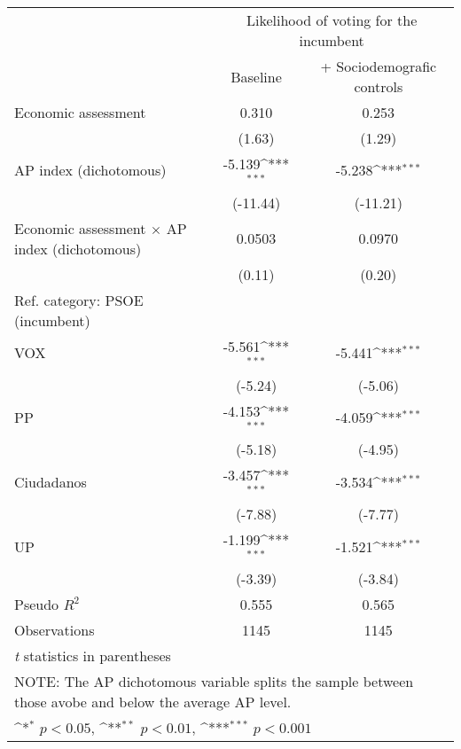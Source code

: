 {
\def\sym#1{\ifmmode^{#1}\else\(^{#1}\)\fi}
\begin{tabular}{l*{2}{c}}
\toprule
                &\multicolumn{2}{c}{Likelihood of voting for the incumbent}\\\cmidrule(lr){2-3}
                & Baseline         &+ Sociodemografic controls         \\
\midrule
Economic assessment&    0.310         &    0.253         \\
                &   (1.63)         &   (1.29)         \\
AP index (dichotomous)&   -5.139\sym{***}&   -5.238\sym{***}\\
                & (-11.44)         & (-11.21)         \\
Economic assessment $\times$ AP index (dichotomous)&   0.0503         &   0.0970         \\
                &   (0.11)         &   (0.20)         \\
Ref. category: PSOE (incumbent)&                  &                  \\
VOX             &   -5.561\sym{***}&   -5.441\sym{***}\\
                &  (-5.24)         &  (-5.06)         \\
PP              &   -4.153\sym{***}&   -4.059\sym{***}\\
                &  (-5.18)         &  (-4.95)         \\
Ciudadanos      &   -3.457\sym{***}&   -3.534\sym{***}\\
                &  (-7.88)         &  (-7.77)         \\
UP              &   -1.199\sym{***}&   -1.521\sym{***}\\
                &  (-3.39)         &  (-3.84)         \\
\midrule
Pseudo \(R^{2}\)&    0.555         &    0.565         \\
Observations    &     1145         &     1145         \\
\bottomrule
\multicolumn{3}{l}{\footnotesize \textit{t} statistics in parentheses}\\
\multicolumn{3}{l}{\footnotesize NOTE: The AP dichotomous variable splits the sample between those avobe and below the average AP level.}\\
\multicolumn{3}{l}{\footnotesize \sym{*} \(p<0.05\), \sym{**} \(p<0.01\), \sym{***} \(p<0.001\)}\\
\end{tabular}
}
